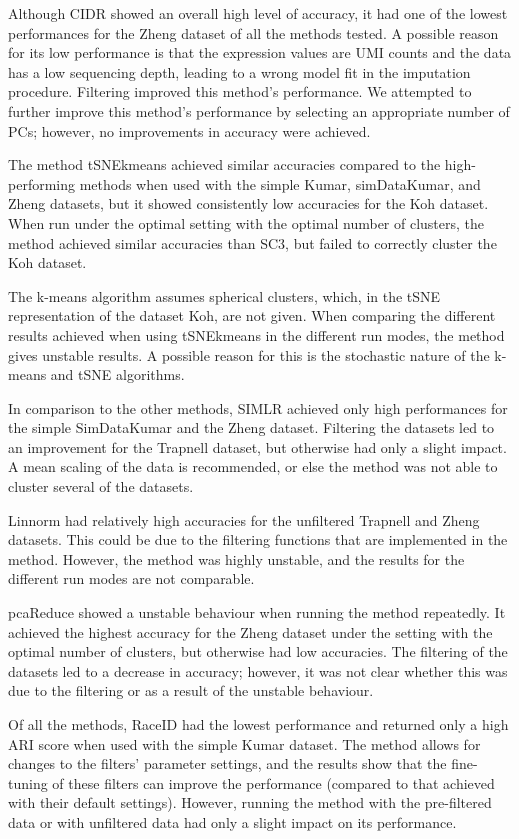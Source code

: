 \documentclass[12pt, a4paper]{article}\usepackage[]{graphicx}\usepackage[]{color}
\begin{document}
Although CIDR showed an overall high level of accuracy, it had one of the lowest performances for the Zheng dataset of all the methods tested. A possible reason for its low performance is that the expression values are UMI counts and the data has a low sequencing depth, leading to a wrong model fit in the imputation procedure. Filtering improved this method’s performance. We attempted to further improve this method’s performance by selecting an appropriate number of PCs; however, no improvements in accuracy were achieved. 

The method tSNEkmeans achieved similar accuracies compared to the high-performing methods when used with the simple Kumar, simDataKumar, and Zheng datasets, but it showed consistently low accuracies for the Koh dataset. When run under the optimal setting with the optimal number of clusters, the method achieved similar accuracies than SC3, but failed to correctly cluster the Koh dataset. 

The k-means algorithm assumes spherical clusters, which, in the tSNE representation of the dataset Koh, are not given. When comparing the different results achieved when using tSNEkmeans in the different run modes, the method gives unstable results. A possible reason for this is the stochastic nature of the k-means and tSNE algorithms. 

In comparison to the other methods, SIMLR achieved only high performances for the simple SimDataKumar and the Zheng dataset. Filtering the datasets led to an improvement for the Trapnell dataset, but otherwise had only a slight impact. A mean scaling of the data is recommended, or else the method was not able to cluster several of the datasets. 

Linnorm had relatively high accuracies for the unfiltered Trapnell and Zheng datasets. This could be due to the filtering functions that are implemented in the method. However, the method was highly unstable, and the results for the different run modes are not comparable. 

pcaReduce showed a unstable behaviour when running the method repeatedly. It achieved the highest accuracy for the Zheng dataset under the setting with the optimal number of clusters, but otherwise had low accuracies. The filtering of the datasets led to a decrease in accuracy; however, it was not clear whether this was due to the filtering or as a result of the unstable behaviour. 

Of all the methods, RaceID had the lowest performance and returned only a high ARI score when used with the simple Kumar dataset. The method allows for changes to the filters’ parameter settings, and the results show that the fine-tuning of these filters can improve the performance (compared to that achieved with their default settings). However, running the method with the pre-filtered data or with unfiltered data had only a slight impact on its performance.
\end{document}

